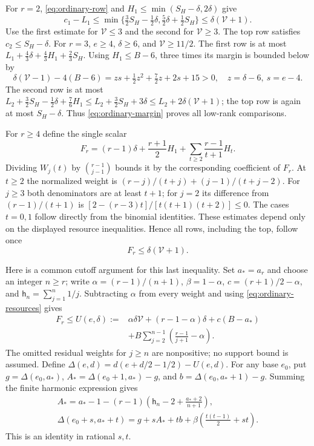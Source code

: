 For $r=2$, \eqref{eq:ordinary-row} and
$H_1\le\min(S_H-\delta,2\delta)$ give
\[
 c_1-L_1\le\min\{\tfrac32S_H-\tfrac12\delta,
                         \tfrac52\delta+\tfrac12S_H\}
 \le\delta(\mathcal V+1).
\]
Use the first estimate for $\mathcal V\le3$ and the second for
$\mathcal V\ge3$.  The top row satisfies $c_2\le S_H-\delta$.
For $r=3$, $e\ge4$, $\delta\ge6$, and $\mathcal V\ge11/2$.
The first row is at most
$L_1+\frac43\delta+\frac43H_1+\frac23S_H$.
Using $H_1\le B-6$, three times its margin is bounded below by
\[
 \delta(\mathcal V-1)-4(B-6)
 =zs+\tfrac12z^2+\tfrac72z+2s+15>0,
 \quad z=\delta-6,\ s=e-4.
\]
The second row is at most
$L_2+\frac32S_H-\frac12\delta+\frac76H_1
 \le L_2+\frac32S_H+3\delta
 \le L_2+2\delta(\mathcal V+1)$;
the top row is again at most $S_H-\delta$.
Thus \eqref{eq:ordinary-margin} proves all low-rank comparisons.

For $r\ge4$ define the single scalar
\[
 F_r=(r-1)\delta+\frac{r+1}{2}H_1
              +\sum_{t\ge2}\frac{r-1}{t+1}H_t.
\]
Dividing $W_j(t)$ by $\binom{r-1}{j-1}$ bounds it by the corresponding
coefficient of $F_r$.  At $t\ge2$ the normalized weight is
$(r-j)/(t+j)+(j-1)/(t+j-2)$.
For $j\ge3$ both denominators are at least $t+1$; for $j=2$ its difference
from $(r-1)/(t+1)$ is
$[2-(r-3)t]/[t(t+1)(t+2)]\le0$.
The cases $t=0,1$ follow directly from the binomial identities.
These estimates depend only on the displayed resource inequalities.
Hence all rows, including the top, follow once
\begin{equation}\label{eq:ordinary-scalar}
 F_r\le\delta(\mathcal V+1).
\end{equation}

Here is a common cutoff argument for this last inequality.
Set $a_*=a_r$ and choose an integer $n\ge r$; write
$\alpha=(r-1)/(n+1)$, $\beta=1-\alpha$,
$c=(r+1)/2-\alpha$, and $\mathsf h_n=\sum_{j=1}^n1/j$.
Subtracting $\alpha$ from every weight and using
\eqref{eq:ordinary-resources} gives
\begin{equation}\label{eq:ordinary-cutoff}
 \begin{split}
 F_r\le U(e,\delta):={}&\alpha\delta\mathcal V
 +(r-1-\alpha)\delta+c(B-a_*)\\
 &+B\sum_{j=2}^{n-1}\left(\frac{r-1}{j+1}-\alpha\right).
 \end{split}
\end{equation}
The omitted residual weights for $j\ge n$ are nonpositive; no support
bound is assumed.  Define $\Delta(e,d)=d(e+d/2-1/2)-U(e,d)$.
For any base $e_0$, put $g=\Delta(e_0,a_*)$,
$A_*=\Delta(e_0+1,a_*)-g$, and $b=\Delta(e_0,a_*+1)-g$.
Summing the finite harmonic expression gives
\begin{equation}\label{eq:ordinary-gap-shift}
 \begin{gathered}
 A_*=a_*-1-(r-1)\left(\mathsf h_n-2+\frac{a_*+2}{n+1}\right),\\
 \Delta(e_0+s,a_*+t)
 =g+sA_*+tb+\beta\left(\frac{t(t-1)}2+st\right).
 \end{gathered}
\end{equation}
This is an identity in rational $s,t$.

